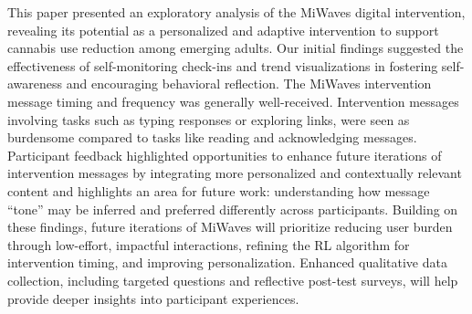 This paper presented an exploratory analysis of the MiWaves digital intervention, revealing its potential as a personalized and adaptive intervention to support cannabis use reduction among emerging adults. Our initial findings suggested the effectiveness of self-monitoring check-ins and trend visualizations in fostering self-awareness and encouraging behavioral reflection. The MiWaves intervention message timing and frequency was generally well-received. Intervention messages involving tasks such as typing responses or exploring links, were seen as burdensome compared to tasks like reading and acknowledging messages. Participant feedback highlighted opportunities to enhance future iterations of intervention messages by integrating more personalized and contextually relevant content and highlights
an area for future work: understanding how message ``tone'' may
be inferred and preferred differently across participants.
Building on these findings, future iterations of MiWaves will prioritize reducing user burden through low-effort, impactful interactions, refining the RL algorithm for intervention timing, and improving personalization. Enhanced qualitative data collection, including targeted questions and reflective post-test surveys, will help provide deeper insights into participant experiences. 